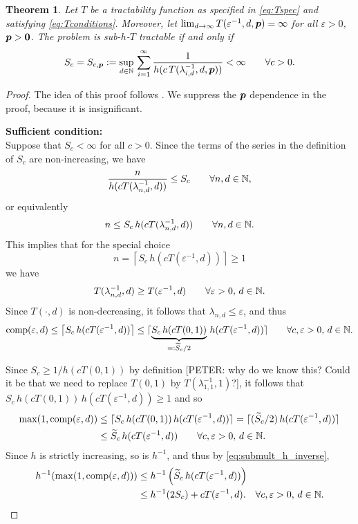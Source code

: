 \documentclass[sort&compress]{elsarticle}
\newcommand{\peter}[1]{\begingroup\color{purple}#1\endgroup}
\newtheorem{theorem}{Theorem}
\begin{document}
\begin{theorem}\label{thm:subhT}
	Let $T$ be a tractability function as specified in \eqref{eq:Tspec} and satisfying \eqref{eq:Tconditions}.  Moreover, let $\lim_{d \to \infty} T(\varepsilon^{-1},d,\boldsymbol{p}) = \infty$ for all $\varepsilon > 0$, $\boldsymbol{p} > \boldsymbol{0}$.  The problem is sub-$h$-$T$ tractable if and only if
	\[
	S_c = S_{c,\boldsymbol{p}} :=\sup_{d\in\mathbb{N}}  \, \sum_{i=1}^\infty \frac1{h(c\, T(\lambda_{i,d}^{-1},d,\boldsymbol{p}))} <\infty \qquad \forall c > 0.
	\]
\end{theorem}
\begin{proof}
The idea of this proof follows \cite{WerWoz17a}.
We suppress the $\boldsymbol{p}$ dependence in the proof, because it is insignificant.

\bigskip

\noindent \textbf{Sufficient condition:}\\
Suppose that $S_c <\infty$ for all $c>0$.  Since the terms of the series in the definition of $S_c$ are non-increasing, we have
	\[
		\frac{n}{h(cT(\lambda_{n,d}^{-1},d))}\le S_c \qquad \forall n,d \in \mathbb{N},
	\]
or equivalently
\[
	n\le S_c \, h(cT(\lambda_{n,d}^{-1},d))   \qquad \forall n,d \in \mathbb{N}.
\]
This implies that for the special choice
\[
	n = \left\lceil
	S_c \, h(cT(\varepsilon^{-1},d))
	\right\rceil \ge 1
\]
	we have
	\[
	T(\lambda_{n,d}^{-1},d) \ge T(\varepsilon^{-1},d) \qquad \forall \varepsilon > 0, \, d \in \mathbb{N}.
	\]
Since $T(\cdot,d)$ is non-decreasing, it follows that $\lambda_{n,d} \le \varepsilon$, and thus
\[
\operatorname{comp}(\varepsilon,d) \le  \left\lceil
S_c \, h(cT(\varepsilon^{-1},d))
\right\rceil \le   \lceil \underbrace{
S_c \, h(cT(0,1))}_{=: \widetilde{S}_c/2} \, h(cT(\varepsilon^{-1},d))
\rceil\qquad \forall c, \varepsilon > 0, \, d \in \mathbb{N}.
\]

Since $S_c \ge 1/h(cT(0,1))$ by definition \peter{[PETER: why do we know this? Could it be that we need to replace $T(0,1)$ by $T(\lambda_{1,1}^{-1},1)$?]}, it follows that $S_c \, h(cT(0,1)) \, h(cT(\varepsilon^{-1},d))  \ge 1$ and so
\begin{align*}
\max(1,\operatorname{comp}(\varepsilon,d))
& \le  \lceil  S_c \, h(cT(0,1)) \, h(cT(\varepsilon^{-1},d))   \rceil
 =  \lceil
(\widetilde{S}_c/2) \, h(cT(\varepsilon^{-1},d))
\rceil \\
& \le   \widetilde{S}_c \, h(cT(\varepsilon^{-1},d))
\qquad\forall c, \varepsilon > 0, \, d \in \mathbb{N}.
\end{align*}
Since $h$ is strictly increasing, so is $h^{-1}$, and thus by \eqref{eq:submult_h_inverse}, 
\begin{align*}
h^{-1}(\max(1,\operatorname{comp}(\varepsilon,d)) ) & \le  h^{-1} \left(
\widetilde{S}_c \, h(cT(\varepsilon^{-1},d))  \right)
\\
&  \le  h^{-1} (2 S_c) + cT (\varepsilon^{-1},d).
\quad \forall c, \varepsilon > 0, \, d \in \mathbb{N}.
\end{align*}


\end{proof}
\end{document}
